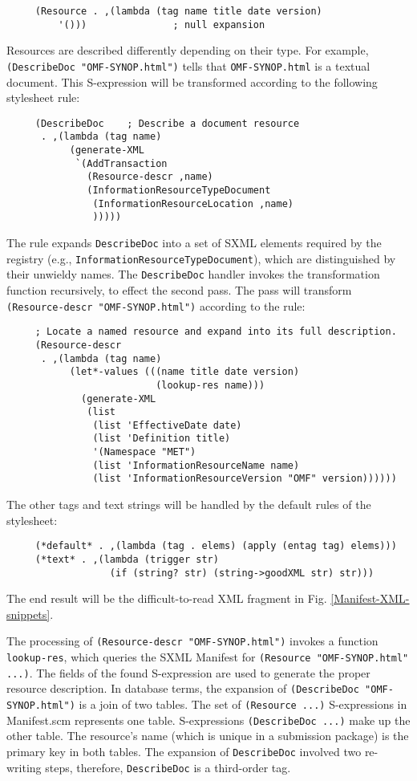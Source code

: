 \documentclass[10pt]{llncs}
\begin{document}
\begin{verbatim}
     (Resource . ,(lambda (tag name title date version)
         '()))               ; null expansion
\end{verbatim}
Resources are described differently depending on their type. 
For example, \texttt{(DescribeDoc "OMF-SYNOP.html")} tells that \texttt{OMF-SYNOP.html} is a textual document. This S-expression will be transformed according to the following stylesheet rule:

\begin{verbatim}
     (DescribeDoc    ; Describe a document resource
      . ,(lambda (tag name)
           (generate-XML
            `(AddTransaction
              (Resource-descr ,name)
              (InformationResourceTypeDocument
               (InformationResourceLocation ,name)
               )))))
\end{verbatim}
The rule expands \texttt{DescribeDoc} into a set of SXML
elements required by the registry (e.g., \texttt{InformationResourceTypeDocument}), which are distinguished by
their unwieldy names. The \texttt{DescribeDoc} handler invokes the
transformation function recursively, to effect the second pass. The
pass will transform \texttt{(Resource-descr "OMF-SYNOP.html")} according to the rule:

\begin{verbatim}
     ; Locate a named resource and expand into its full description.
     (Resource-descr
      . ,(lambda (tag name)
           (let*-values (((name title date version)
                          (lookup-res name)))
             (generate-XML
              (list
               (list 'EffectiveDate date)
               (list 'Definition title)
               '(Namespace "MET")
               (list 'InformationResourceName name)
               (list 'InformationResourceVersion "OMF" version))))))
\end{verbatim}
The other tags and text strings will be handled by the default rules of the stylesheet:

\begin{verbatim}
     (*default* . ,(lambda (tag . elems) (apply (entag tag) elems)))
     (*text* . ,(lambda (trigger str) 
                  (if (string? str) (string->goodXML str) str)))
\end{verbatim}
The end result will be the difficult-to-read XML fragment in Fig. \ref{Manifest-XML-snippets}.

The processing of \texttt{(Resource-descr "OMF-SYNOP.html")} invokes a function \texttt{lookup-res}, which queries the SXML Manifest for \texttt{(Resource "OMF-SYNOP.html" ...)}. The fields of the found
S-expression are used to generate the proper resource description. In
database terms, the expansion of \texttt{(DescribeDoc
"OMF-SYNOP.html")} is a join of two tables.  The set of \texttt{(Resource ...)} S-expressions in Manifest.scm represents one
table. S-expressions \texttt{(DescribeDoc ...)} make up the other
table. The resource's name (which is unique in a submission package)
is the primary key in both tables. The expansion of \texttt{DescribeDoc} involved two re-writing steps, therefore, \texttt{DescribeDoc} is a third-order tag.
\end{document}
